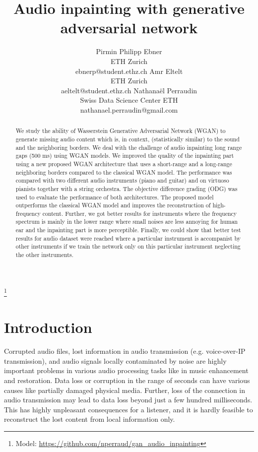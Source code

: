 \documentclass{article} %
\title{Audio inpainting with generative adversarial network}
\author{
Pirmin Philipp Ebner\\
ETH Zurich
\\
ebnerp@student.ethz.ch
\And
Amr Eltelt\\
ETH Zurich\\
aeltelt@student.ethz.ch
\And
Nathanaël Perraudin\\
Swiss Data Science Center ETH\\
nathanael.perraudin@gmail.com
}
\begin{document}
\maketitle

\begin{abstract}
We study the ability of Wasserstein Generative Adversarial Network (WGAN) to generate missing audio content which is, in context, (statistically similar) to the sound and the neighboring borders. We deal with the challenge of audio inpainting long range gaps (500 ms) using WGAN models. We improved the quality of the inpainting part using a new proposed WGAN architecture that uses a short-range and a long-range neighboring borders compared to the classical WGAN model. The performance was compared with two different audio instruments (piano and guitar) and on virtuoso pianists together with a string orchestra. The objective difference grading (ODG) was used to evaluate the performance of both architectures. The proposed model outperforms the classical WGAN model and improves the reconstruction of high-frequency content. Further, we got better results for instruments where the frequency spectrum is mainly in the lower range where small noises are less annoying for human ear and the inpainting part is more perceptible. Finally, we could show that better test results for audio dataset were reached where a particular instrument is accompanist by other instruments if we train the network only on this particular instrument neglecting the other instruments. 

\end{abstract}
\let\thefootnote\relax\footnote{Model: \url{https://github.com/nperraud/gan_audio_inpainting}}
\section{Introduction}
Corrupted audio files, lost information in audio transmission (e.g. voice-over-IP transmission), and audio signals locally contaminated by noise are highly important problems in various audio processing tasks like in music enhancement and restoration. Data loss or corruption in the range of seconds can have various causes like partially damaged physical media. Further, loss of the connection in audio transmission may lead to data loss beyond just a few hundred milliseconds. This has highly unpleasant consequences for a listener, and it is hardly feasible to reconstruct the lost content from local information only.
\end{document}
